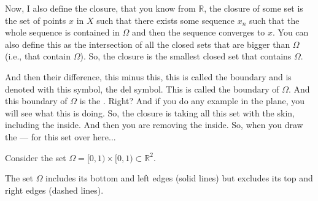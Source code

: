\begin{spoken-clean}[00:02:29 - 00:03:43]
Now, I also define the closure, that you know from $\mathbb{R}$, the closure of some set is the set of points $x$ in $X$ such that there exists some sequence $x_n$ such that the whole sequence is contained in $\Omega$ and then the sequence converges to $x$. You can also define this as the intersection of all the closed sets that are bigger than $\Omega$ (i.e., that contain $\Omega$). So, the closure is the smallest closed set that contains $\Omega$.
\end{spoken-clean}

\begin{spoken-clean}[00:03:43 - 00:05:33]
And then their difference, this minus this, this is called the boundary and is denoted with this symbol, the del symbol. This is called the boundary of $\Omega$. And this boundary of $\Omega$ is the . Right? And if you do any example in the plane, you will see what this is doing. So, the closure is taking all this set with the skin, including the inside. And then you are removing the inside. So, when you draw the --- for this set over here... 
\end{spoken-clean}

\begin{math-stroke}[Example: The Square \texorpdfstring{$[0, 1) \times [0, 1)$}{[0, 1) x [0, 1)}]
Consider the set $\Omega = [0, 1) \times [0, 1) \subset \mathbb{R}^2$.
\begin{center}
\end{center}

\begin{explanation-of-steps}
The set $\Omega$ includes its bottom and left edges (solid lines) but excludes its top and right edges (dashed lines).
\end{explanation-of-steps}
\end{math-stroke}

